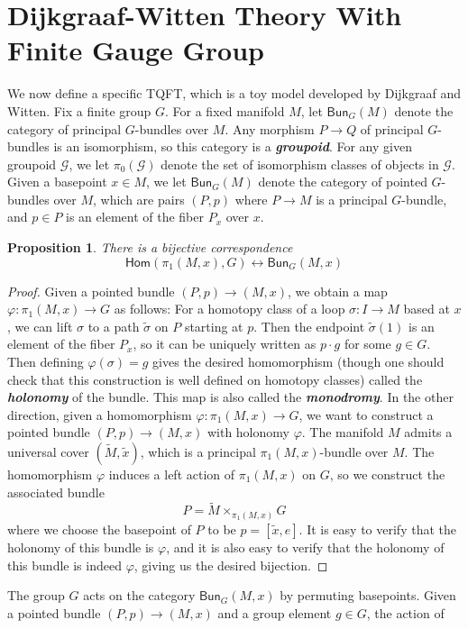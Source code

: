 \documentclass[psamsfonts, 11pt]{amsart}
\newtheorem{prop}[thm]{Proposition}
\theoremstyle{definition}
\theoremstyle{remark}
\renewcommand{\hom}{\mathsf{Hom}}
\newcommand{\ib}[1]{\textbf{\textit{#1}}}
\newcommand{\Bun}{\mathsf{Bun}}
\begin{document}
\section{Dijkgraaf-Witten Theory With Finite Gauge Group}
%
We now define a specific TQFT, which is a toy model developed by Dijkgraaf and Witten.
Fix a finite group $G$. For a fixed manifold $M$, let $\Bun_G(M)$ denote the
category of principal $G$-bundles over $M$. Any morphism $P \to Q$ of principal
$G$-bundles is an isomorphism, so this category is a \ib{groupoid}. For any given
groupoid $\mathcal{G}$, we let $\pi_0(\mathcal{G})$ denote the set of isomorphism
classes of objects in $\mathcal{G}$. Given a basepoint
$x \in M$, we let $\Bun_G(M)$ denote the category of pointed $G$-bundles over $M$,
which are pairs $(P,p)$ where $P \to M$ is a principal $G$-bundle, and $p\in P$ is
an element of the fiber $P_x$ over $x$.
%
\begin{prop}
There is a bijective correspondence
\[
\hom(\pi_1(M, x), G) \longleftrightarrow \Bun_G(M, x)
\]
\end{prop}
%
\begin{proof}
Given a pointed bundle $(P,p) \to (M,x)$, we obtain a map $\varphi : \pi_1(M,x) \to G$
as follows: For a homotopy class of a loop $\sigma : I \to M$ based at $x$, we
can lift $\sigma$ to a path $\tilde{\sigma}$ on $P$ starting at $p$. Then the endpoint
$\tilde{\sigma}(1)$ is an element of the fiber $P_x$, so it can be uniquely written
as $p \cdot g$ for some $g \in G$. Then defining $\varphi(\sigma) = g$ gives the
desired homomorphism (though one should check that this construction is well defined
on homotopy classes) called the \ib{holonomy} of the bundle. This map is also
called the \ib{monodromy}. In the other direction, given a homomorphism
$\varphi : \pi_1(M,x) \to G$, we want to construct a pointed bundle
$(P,p) \to (M, x)$ with holonomy $\varphi$. The manifold $M$ admits a universal
cover $(\widetilde{M}, \tilde{x})$, which is a principal $\pi_1(M, x)$-bundle over $M$.
The homomorphism $\varphi$ induces a left action of $\pi_1(M, x)$ on $G$, so we
construct the associated bundle
\[
P = \widetilde{M} \times_{\pi_1(M, x)} G
\]
where we choose the basepoint of $P$ to be $p = [\tilde{x}, e]$. It is easy to
verify that the holonomy of this bundle is $\varphi$, and it is also easy to verify
that the holonomy of this bundle is indeed $\varphi$, giving us the desired bijection.
\end{proof}
%
The group $G$ acts on the category $\Bun_G(M,x)$ by permuting basepoints. Given
a pointed bundle $(P, p) \to (M, x)$ and a group element $g \in G$, the action of
\end{document}
